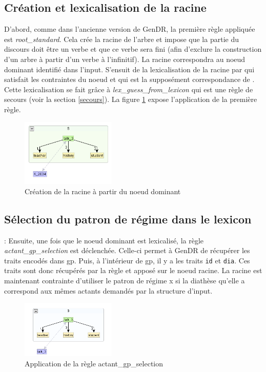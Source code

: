 \subsection{Création et lexicalisation de la racine}
D'abord, comme dans l'ancienne version de GenDR, la première règle appliquée est \emph{root\_standard}. Cela crée la racine de l'arbre et impose que la partie du discours doit être un verbe et que ce verbe sera fini (afin d'exclure la construction d'un arbre à partir d'un verbe à l'infinitif). La racine correspondra au noeud dominant identifié dans l'input. S'ensuit de la lexicalisation de la racine par  qui satisfait les contraintes du noeud et qui est la supposément correspondance de . Cette lexicalisation se fait grâce à \emph{lex\_guess\_from\_lexicon} qui est une règle de secours (voir la section \ref{secours}). La figure \ref{deroulement0} expose l'application de la première règle.

\begin{figure}[htb]
	\centering
	\includegraphics[width=0.4\textwidth, trim = {0cm 0cm 0cm 0cm},clip]{ch6/figs/root.png}
	\caption{Création de la racine à partir du noeud dominant}
	\label{deroulement0}
\end{figure}

\subsection{Sélection du patron de régime dans le lexicon}:
Ensuite, une fois que le noeud dominant est lexicalisé, la règle \emph{actant\_gp\_selection} est déclenchée. Celle-ci permet à GenDR de récupérer les traits encodés dans gp. Puis, à l'intérieur de gp, il y a les traits \texttt{id} et \texttt{dia}. Ces traits sont donc récupérés par la règle et apposé sur le noeud racine. La racine est maintenant contrainte d'utiliser le patron de régime x si la diathèse qu'elle a correspond aux mêmes actants demandés par la structure d'input.

\begin{figure}[htb]
	\centering
	\includegraphics[width=0.4\textwidth, trim = {0cm 0cm 0cm 0cm},clip]{ch6/figs/selectiongp.png}
	\caption{Application de la règle actant\_gp\_selection}
	\label{deroulement1}
\end{figure}

